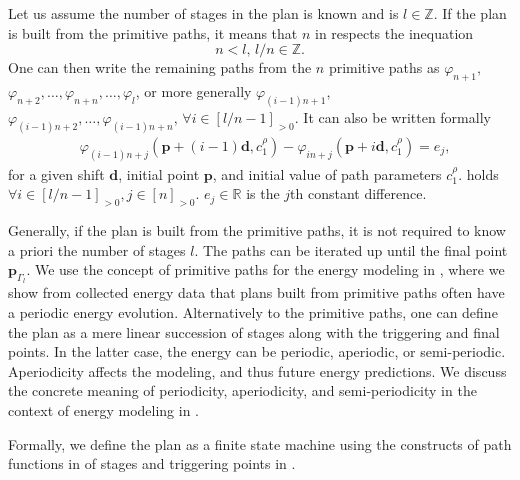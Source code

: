 Let us assume the number of stages in the plan is known and is $l\in\mathbb{Z}$. If the plan is built from the primitive paths, it means that $n$ in  respects the inequation
\begin{equation}
  n<l,\,l/n\in\mathbb{Z}.
\end{equation}
One can then write the remaining paths from the $n$ primitive paths as $\varphi_{n+1},$ $\varphi_{n+2},\dots,\varphi_{n+n},\dots,\varphi_l$, or more generally $\varphi_{(i-1)n+1},$ $\varphi_{(i-1)n+2},\dots,\varphi_{(i-1)n+n},\,\forall i\in[l/n-1]_{>0}$. It can also be written formally
\begin{equation}\label{eq:primitive}\begin{split}
  &\varphi_{(i-1)n+j}(\mathbf{p}+(i-1)\mathbf{d},c_1^\rho)-\varphi_{in+j}(\mathbf{p}+i\mathbf{d},c_1^\rho)=e_j,
\end{split}\end{equation}
for a given shift $\mathbf{d}$, initial point $\mathbf{p}$, and initial value of path parameters $c_1^\rho$.  holds $\forall i\in[l/n-1]_{>0},j\in[n]_{>0}$. $e_j\in\mathbb{R}$ is the $j$th constant difference.

Generally, if the plan is built from the primitive paths, it is not required to know a priori the number of stages $l$. The paths can be iterated up until the final point $\mathbf{p}_{\Gamma_l}$. We use the concept of primitive paths for the energy modeling in , where we show from collected energy data that plans built from primitive paths often have a periodic energy evolution. Alternatively to the primitive paths, one can define the plan as a mere linear succession of stages along with the triggering and final points. In the latter case, the energy can be periodic, aperiodic, or semi-periodic. Aperiodicity affects the modeling, and thus future energy predictions. We discuss the concrete meaning of periodicity, aperiodicity, and semi-periodicity in the context of energy modeling in .

Formally, we define the plan as a finite state machine using the constructs of path functions in  of stages and triggering points in .

